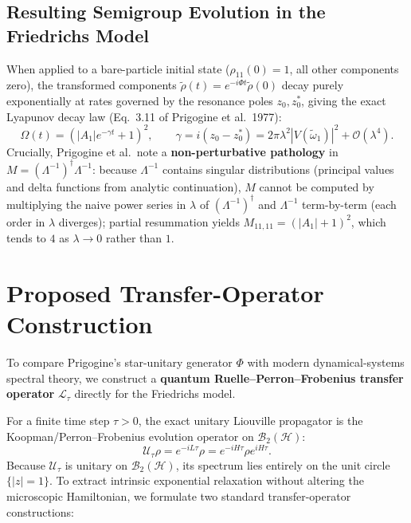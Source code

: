 \documentclass[11pt,a4paper]{article}
\begin{document}
\subsection{Resulting Semigroup Evolution in the Friedrichs Model}
When applied to a bare-particle initial state ($\rho_{11}(0) = 1$, all other components zero), the transformed components $\tilde{\rho}(t) = e^{-i\Phi t}\tilde{\rho}(0)$ decay purely exponentially at rates governed by the resonance poles $z_0, z_0^*$, giving the exact Lyapunov decay law (Eq.~3.11 of Prigogine et al.\ 1977):
\begin{equation}
\Omega(t) = \left( |A_1| e^{-\gamma t} + 1 \right)^2, \qquad \gamma = i(z_0 - z_0^*) = 2\pi\lambda^2 |V(\tilde{\omega}_1)|^2 + \mathcal{O}(\lambda^4).
\end{equation}
Crucially, Prigogine et al.\ note a \textbf{non-perturbative pathology} in $M = (\Lambda^{-1})^\dagger \Lambda^{-1}$: because $\Lambda^{-1}$ contains singular distributions (principal values and delta functions from analytic continuation), $M$ cannot be computed by multiplying the naive power series in $\lambda$ of $(\Lambda^{-1})^\dagger$ and $\Lambda^{-1}$ term-by-term (each order in $\lambda$ diverges); partial resummation yields $M_{11,11} = (|A_1| + 1)^2$, which tends to $4$ as $\lambda \to 0$ rather than $1$.

\section{Proposed Transfer-Operator Construction}

To compare Prigogine's star-unitary generator $\Phi$ with modern dynamical-systems spectral theory, we construct a \textbf{quantum Ruelle--Perron--Frobenius transfer operator} $\mathcal{L}_\tau$ directly for the Friedrichs model.

For a finite time step $\tau > 0$, the exact unitary Liouville propagator is the Koopman/Perron--Frobenius evolution operator on $\mathcal{B}_2(\mathcal{H})$:
\begin{equation}
\mathcal{U}_\tau \rho = e^{-iL\tau}\rho = e^{-iH\tau}\rho e^{iH\tau}.
\end{equation}
Because $\mathcal{U}_\tau$ is unitary on $\mathcal{B}_2(\mathcal{H})$, its spectrum lies entirely on the unit circle $\{|z| = 1\}$. To extract intrinsic exponential relaxation without altering the microscopic Hamiltonian, we formulate two standard transfer-operator constructions:
\end{document}
